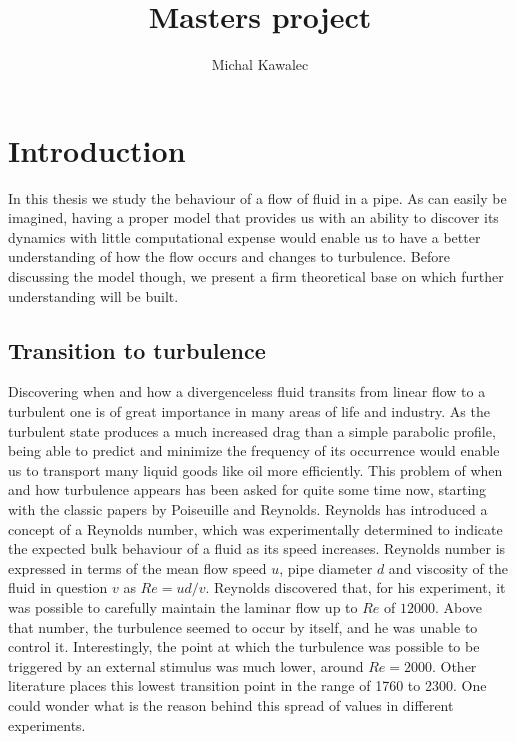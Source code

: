 \documentclass[11pt,a4paper]{article}
\begin{document}
\title{Masters project}
\author{Michal Kawalec}
\maketitle

\section{Introduction}

In this thesis we study the behaviour of a flow of fluid in a pipe.
As can easily be imagined, having a proper model that provides us with an ability to discover its dynamics with little computational expense would enable us to have a better understanding of how the flow occurs and changes to turbulence.
Before discussing the model though, we present a firm theoretical base on which further understanding will be built.

\subsection{Transition to turbulence}
Discovering when and how a divergenceless fluid transits from linear flow to a turbulent one is of great importance in many areas of life and industry.
As the turbulent state produces a much increased drag than a simple parabolic profile, being able to predict and minimize the frequency of its occurrence would enable us to transport many liquid goods like oil more efficiently.
This problem of when and how turbulence appears has been asked for quite some time now, starting with the classic papers by Poiseuille\cite{Poiseuille40} and Reynolds\cite{Reynolds83}.
Reynolds has introduced a concept of a Reynolds number, which was experimentally determined to indicate the expected bulk behaviour of a fluid as its speed increases.
Reynolds number is expressed in terms of the mean flow speed \(u\), pipe diameter \(d\) and viscosity of the fluid in question \(v\) as \(Re = ud/v\).
Reynolds discovered that, for his experiment, it was possible to carefully maintain the laminar flow up to \(Re\) of \(12000\).
Above that number, the turbulence seemed to occur by itself, and he was unable to control it.
Interestingly, the point at which the turbulence was possible to be triggered by an external stimulus was much lower, around \(Re = 2000\).
Other literature places this lowest transition point in the range of 1760 to 2300\cite{Kerswell05}.
One could wonder what is the reason behind this spread of values in different experiments.
\end{document}
